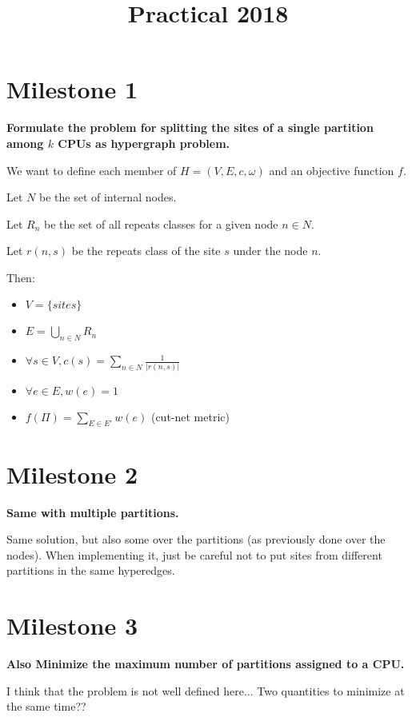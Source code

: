 \documentclass[12pt,a4paper]{article}
\begin{document}
\newcommand*{\figuretitle}[1]{%
    {\centering%
    \textbf{#1}%
    \par\medskip}%
}
\title{Practical 2018}
\maketitle



\section{Milestone 1}

{\bf Formulate the problem for splitting the sites of a single partition among $k$ CPUs as hypergraph problem.}
 
We want to define each member of $H=(V,E,c,\omega)$ and an objective function $f$.

Let $N$ be the set of internal nodes.

Let $R_n$ be the set of all repeats classes for a given node $n\in N$.

Let $r(n, s)$ be the repeats class of the site $s$ under the node $n$.  

Then:
\begin{itemize}
\item $V = \{sites\}$
\item $E = \bigcup_{n \in N} R_n$
\item $\forall s \in V, c(s) = \sum_{n \in N}\frac{1}{|r(n, s)|}$
\item $\forall e \in E, w(e) = 1$
\item $f(\Pi) = \sum_{E \in E'}w(e)$ \hspace{0.5cm}(cut-net metric)
\end{itemize}

\section{Milestone 2}

{\bf Same with multiple partitions.}

Same solution, but also some over the partitions (as previously done over the nodes). When implementing it, just be careful not to put sites from different partitions in the same hyperedges.


\section{Milestone 3}

{\bf Also Minimize the maximum number of partitions assigned to a CPU.}

I think that the problem is not well defined here... Two quantities to minimize at the same time??
\end{document}
